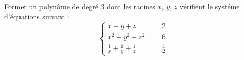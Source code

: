 Former un polynôme de degré 3 dont les racines $x$, $y$, $z$ vérifient le systéme d'équations suivant :
\[
\left\lbrace 
\begin{array}{ccc}
x+y+z &=&2 \\
x^2+y^2+z^2 &=& 6 \\
\frac{1}{x}+\frac{1}{y}+\frac{1}{z}&=&\frac{1}{2}
\end{array}
\right.
\]

